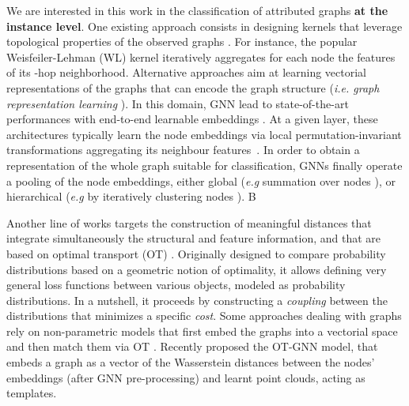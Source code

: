 \documentclass{article}
\begin{document}
We are interested in this work in the classification of attributed graphs {\bf at the instance level}.
One existing approach consists in designing kernels that leverage topological properties of the observed graphs
\cite{borgwardt2005shortest, feragen2013scalable,gartner2003graph,
shervashidze2009efficient}. For instance, the popular
Weisfeiler-Lehman (WL) kernel \cite{shervashidze2011weisfeiler} iteratively aggregates for each node the features of its -hop neighborhood. Alternative approaches aim at learning vectorial
representations of the graphs that can encode the graph structure (\emph{i.e. graph
representation learning} \cite{Chami2022}). 
In this domain, GNN lead to state-of-the-art performances with 
end-to-end learnable embeddings \cite{wu2020comprehensive}. 
At a given layer, these architectures typically
learn the node embeddings via local permutation-invariant transformations
aggregating its neighbour features~\cite{maron2018invariant,kipf2016semi, hamilton2017inductive,
xu2018powerful}. In order to obtain a representation of the whole graph suitable for classification, GNNs finally operate a pooling \cite{knyazev2019understanding, mesquita2020rethinking} of
the node embeddings, either global (\textit{e.g} summation over nodes
\cite{xu2018powerful}), or hierarchical (\textit{e.g} by iteratively clustering nodes \cite{zhang2018end,ying2018hierarchical,  lee2019self}). B

Another line of works targets the construction of meaningful distances that integrate simultaneously the structural and feature information, and that are based on optimal transport (OT) \cite{villani2009optimal, peyre-computational-2020}. Originally designed to compare probability distributions based on a geometric notion of optimality, it allows defining very general loss functions between various objects, modeled as probability distributions. In a nutshell, it proceeds by constructing a \emph{coupling} between the distributions that minimizes a specific \emph{cost}. Some approaches dealing with graphs rely on non-parametric models that first embed the graphs into a vectorial space and then match them via OT \cite{NikolentzosMV17, Togninalli19, kolouri2020wasserstein, maretic2019got}. Recently \citep{chen2020optimal} proposed the OT-GNN model, that embeds a graph as a vector of the Wasserstein distances between the nodes' embeddings (after GNN pre-processing) and learnt point clouds, acting as templates.
\end{document}
